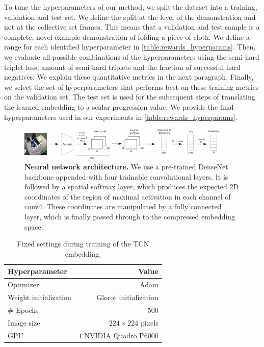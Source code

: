 \documentclass[\home/main.tex]{subfiles}
\begin{document}
To tune the hyperparameters of our method, we split the dataset into a training, validation and test set. We define the split at the level of the demonstration and not at the collective set frames. This means that a validation and test sample is a complete, novel example demonstration of folding a piece of cloth. We define a range for each identified hyperparameter in \cref{table:rewards_hyperparams}. Then, we evaluate all possible combinations of the hyperparameters using the semi-hard triplet loss, amount of semi-hard triplets and the fraction of successful hard negatives. We explain these quantitative metrics in the next paragraph. Finally, we select the set of hyperparameters that performs best on these training metrics on the validation set. The test set is used for the subsequent steps of translating the learned embedding to a scalar progression value. We provide the final hyperparameters used in our experiments in \cref{table:rewards_hyperparams}.

\begin{figure}[htb]
    \centering
    \includegraphics[width=0.90\textwidth, keepaspectratio]{figures/figs_ssr_nn_architecture.png}
    \caption[Neural network architecture for learning time-contrastive embedding.]{
        \textbf{Neural network architecture.} We use a pre-trained DenseNet backbone appended with four trainable convolutional layers. It is followed by a spatial softmax layer, which produces the expected 2D coordinates of the region of maximal activation in each channel of conv4. These coordinates are manipulated by a fully connected layer, which is finally passed through to the compressed embedding space.
    }
    \label{fig:rewards_nn_architecture}
\end{figure}

\begin{table}[htbp]
    \centering
    \caption{Fixed settings during training of the TCN embedding.}
    \begin{tabular}[t]{@{} l r @{}}

        \toprule
        Hyperparameter        & Value                   \\
        \midrule
        Optimizer             & Adam                    \\
        Weight initialization & Glorot initialization   \\
        \# Epochs             & $500$                   \\
        Image size            & $224 \times 224$ pixels \\
        GPU                   & $1$ NVIDIA Quadro P6000 \\
        \bottomrule
    \end{tabular}
    \label{table:rewards_settings}
\end{table}
\end{document}

